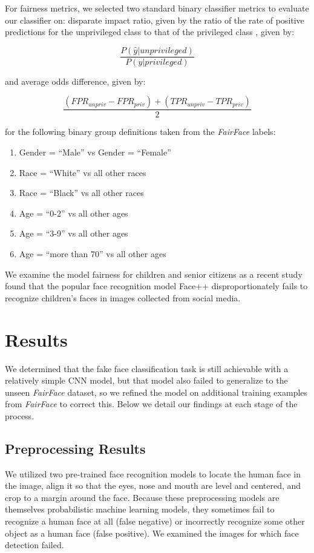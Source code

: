 \documentclass[11pt, letterpaper]{article}
\providecommand{\tightlist}{%
  \setlength{\itemsep}{0pt}\setlength{\parskip}{0pt}
}
\begin{document}
\begin{multicols}{2}
  For fairness metrics, we selected two standard binary classifier
  metrics to evaluate our classifier on: disparate impact ratio, given
  by the ratio of the rate of positive predictions for the
  unprivileged class to that of the privileged class
  \cite{fairMLHealth}, given by:

  $$\frac{P(\hat{y}|unprivileged)}{P(\hat{y}|privileged)}$$

  and average odds difference, given by:

  $$\frac{(FPR_{unpriv} - FPR_{priv}) + (TPR_{unpriv} - TPR_{priv})}{2}$$

  for the following binary group definitions taken from the \emph{FairFace}
  labels:

  \begin{enumerate}
    \tightlist
  \item Gender = ``Male'' vs Gender = ``Female''
  \item Race = ``White'' vs all other races
  \item Race = ``Black'' vs all other races
  \item Age = ``0-2'' vs all other ages
  \item Age = ``3-9'' vs all other ages
  \item Age = ``more than 70'' vs all other ages
  \end{enumerate}

  We examine the model fairness for children and senior citizens as a recent
  study \cite{9156262} found that the popular face recognition model Face++
  disproportionately fails to recognize children's faces in images collected
  from social media.

  \section{Results}

  We determined that the fake face classification task is still
  achievable with a relatively simple CNN model, but that model also
  failed to generalize to the unseen \emph{FairFace} dataset, so we
  refined the model on additional training examples from
  \emph{FairFace} to correct this. Below we detail our findings at
  each stage of the process.

  \subsection{Preprocessing Results}

  We utilized two pre-trained face recognition models to locate the human face
  in the image, align it so that the eyes, nose and mouth are level and
  centered, and crop to a margin around the face. Because these preprocessing
  models are themselves probabilistic machine learning models, they sometimes
  fail to recognize a human face at all (false negative) or incorrectly
  recognize some other object as a human face (false positive). We examined the
  images for which face detection failed.


\end{multicols}
\end{document}
